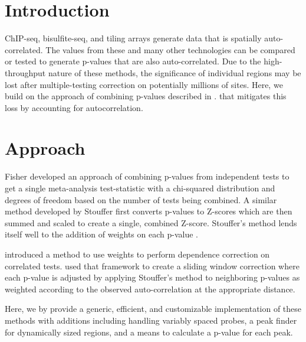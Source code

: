 \documentclass{bioinfo}
\begin{document}
\section{Introduction}
ChIP-seq, bisulfite-seq, and tiling arrays generate data that is spatially
auto-correlated. The values from these and many other technologies can be
compared or tested to generate p-values that are also auto-correlated. Due to the
high-throughput nature of these methods, the significance of individual regions
may be lost after multiple-testing correction on potentially millions of sites.
Here, we build on the approach of combining p-values described in \citealp{Kechris2010}.
that mitigates this loss by accounting for autocorrelation.
\section{Approach}
Fisher \citep{Fisher} developed an approach of combining p-values from independent tests
to get a single meta-analysis test-statistic with a chi-squared distribution
and degrees of freedom based on the number of tests being combined.
A similar method developed by Stouffer \citep{Stouffer} first converts p-values
to Z-scores which are then summed and scaled to create a single, combined Z-score.
Stouffer's method lends itself well to the addition of weights on each p-value
\citep{Liptak}.

\citealp{Zaykin2002} introduced a method to use weights to perform dependence
correction on correlated tests. \citealp{Kechris2010} used that framework to create
a sliding window correction where each p-value is adjusted by
applying Stouffer's method to neighboring p-values as weighted according to the
observed auto-correlation at the appropriate distance.

Here, we by provide a generic, efficient, and customizable implementation
of these methods with additions including handling variably spaced probes,
a peak finder for dynamically sized regions, and a means to calculate a
p-value for each peak.
\end{document}
